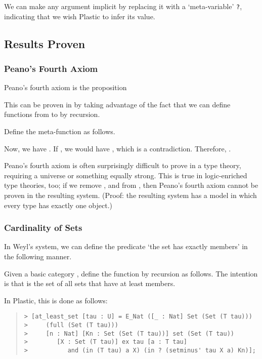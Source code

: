\documentclass[acmtocl]{acmtrans2m}
\begin{document}
We can make any argument implicit by replacing it with a `meta-variable' \texttt{?},
indicating that we wish Plastic to infer its value.



\subsection{Results Proven}

\subsubsection{Peano's Fourth Axiom}
Peano's fourth axiom is the proposition

This can be proven in  by taking advantage of the fact that we can define functions from  to  by recursion.

Define the meta-function  as follows.

Now, we have .  If , we would have , which is a contradiction.  Therefore, .

Peano's fourth axiom is often surprisingly difficult to prove in a type theory, requiring a universe or something equally strong.  This is true in logic-enriched type theories, too; if we remove ,  and  from , then Peano's fourth axiom cannot be proven in the resulting system.  (Proof: the resulting system has a model in which every type has exactly one object.)

\subsubsection{Cardinality of Sets}
\label{section:cardinality}

In Weyl's system, we can define the predicate `the set  has
exactly  members' in the following manner.

Given a basic category , define the function  by recursion as follows.  The intention
is that  is the set of all sets  that have at
least  members.

In Plastic, this is done as follows:
\begin{quote}
 \begin{verbatim}
> [at_least_set [tau : U] = E_Nat ([_ : Nat] Set (Set (T tau)))
>     (full (Set (T tau)))
>     [n : Nat] [Kn : Set (Set (T tau))] set (Set (T tau))
>        [X : Set (T tau)] ex tau [a : T tau]
>           and (in (T tau) a X) (in ? (setminus' tau X a) Kn)];
\end{verbatim}
\end{quote}
\end{document}
